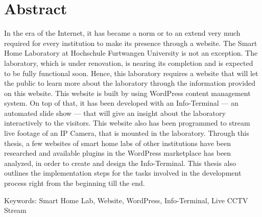 \chapter{Abstract}
In the era of the Internet, it has became a norm or to an extend very much required for every institution to make its presence through a website. The Smart Home Laboratory at Hochschule Furtwangen University is not an exception. The laboratory, which is under renovation, is nearing its completion and is expected to be fully functional soon. Hence, this laboratory requires a website that will let the public to learn more about the laboratory through the information provided on this website. This website is built by using WordPress content management system. On top of that, it has been developed with an Info-Terminal --- an automated slide show --- that will give an insight about the laboratory interactively to the visitors. This website also has been programmed to stream live footage of an IP Camera, that is mounted in the laboratory. Through this thesis, a few websites of smart home labs of other institutions have been researched and available plugins in the WordPress marketplace has been analyzed, in order to create and design the Info-Terminal. This thesis also outlines the implementation steps for the tasks involved in the development process right from the beginning till the end.

\vspace{12pt}
\noindent
Keywords: Smart Home Lab, Website, WordPress, Info-Terminal, Live CCTV Stream